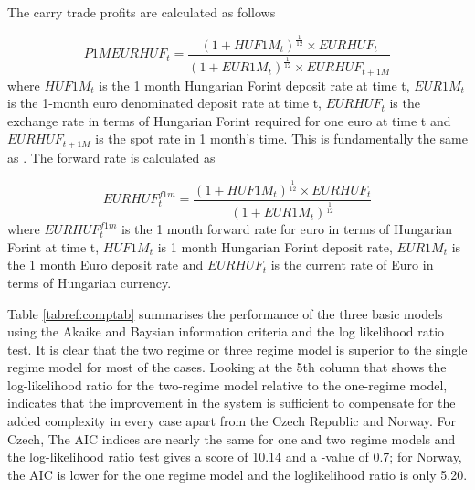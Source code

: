 \documentclass[12pt, a4paper, oneside]{article} %
\begin{document}
The carry trade profits are calculated as follows

\begin{equation}\label{eqref:carryprofit}
P1MEURHUF_t = \frac{(1 + HUF1M_t)^{\frac{1}{12}} \times EURHUF_t }{(1 + EUR1M_t)^{\frac{1}{12}} \times EURHUF_{t+1M}}
\end{equation}
where $HUF1M_t$ is the 1 month Hungarian Forint deposit rate at time t, $EUR1M_t$ is the 1-month euro denominated deposit rate at time t, $EURHUF_t$ is the exchange rate in terms of  Hungarian Forint required for one euro at time t and  $EURHUF_{t+1M}$ is the spot rate in 1 month's time.  This is fundamentally the same as \citep{BrunnermeierCarry}. The forward rate is calculated as

\begin{equation}\label{eqref:forward}
EURHUF_t^{f1m} = \frac{(1 + HUF1M_t)^{\frac{1}{12}} \times EURHUF_t }{(1 + EUR1M_t)^{\frac{1}{12}}}
\end{equation}
where  $EURHUF_t^{f1m}$ is the 1 month forward rate for euro in terms of Hungarian Forint at time t, $HUF1M_t$ is 1 month Hungarian Forint deposit rate, $EUR1M_t$ is the 1 month Euro deposit rate and $EURHUF_t$ is the current rate of Euro in terms of Hungarian currency.  


Table \ref{tabref:comptab} summarises the performance of the three basic models using the Akaike and Baysian information criteria and the log likelihood ratio test.  It is clear that the two regime or three regime model is superior to the single regime model for most of the cases.  Looking at the 5th column that shows the log-likelihood ratio for the two-regime model relative to the one-regime model, indicates that the improvement in the system is sufficient to compensate for the added complexity in every case apart from the Czech Republic and Norway.  For Czech, The AIC indices are nearly the same for one and two regime models and the log-likelihood ratio test gives a score of 10.14 and a -value of 0.7; for Norway, the AIC is lower for the one regime model and the loglikelihood ratio is only 5.20.  
\end{document}
